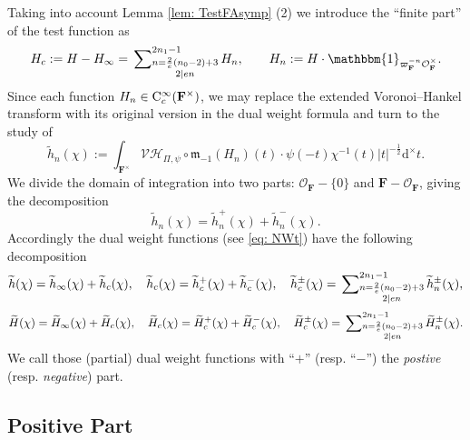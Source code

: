 \documentclass[A4]{amsart}
\numberwithin{equation}{section} \everymath{\displaystyle}
\newcommand{\Cont}{{\rm C}}
\newcommand{\id}{\mathbbm{1}}
\newcommand{\ud}{\mathrm{d}}
\newcommand{\F}{\mathbf{F}}
\newcommand{\vO}{\mathcal{O}}
\newcommand{\norm}[1][\cdot]{\lvert #1 \rvert}
\newcommand{\Mult}{\mathfrak{m}}
\newcommand{\VorH}{\mathcal{VH}}
\begin{document}
	Taking into account Lemma \ref{lem: TestFAsymp} (2) we introduce the ``finite part'' of the test function as
\begin{equation} \label{eq: TestFComp}
	H_c := H-H_{\infty} = \sideset{}{_{\substack{n=\frac{2}{e}(n_0-2)+3 \\ 2 \mid en}}^{2n_1-1}} \sum H_n, \qquad H_n := H \cdot \id_{\varpi_{\F}^{-n} \vO_{\F}^{\times}}.
\end{equation}
	Since each function $H_n \in \Cont_c^{\infty}(\F^{\times})$, we may replace the extended Voronoi--Hankel transform with its original version in the dual weight formula and turn to the study of
\begin{equation} \label{eq: DWtFLeveln}
	\widetilde{h}_n(\chi) := \int_{\F^{\times}} \VorH_{\Pi,\psi} \circ \Mult_{-1}(H_n)(t) \cdot \psi(-t) \chi^{-1}(t) \norm[t]^{-\frac{1}{2}} \ud^{\times} t.
\end{equation}
	We divide the domain of integration into two parts: $\vO_{\F}-\{ 0 \}$ and $\F-\vO_{\F}$, giving the decomposition
\begin{equation} \label{eq: DWtFLevelnDecomp}
	\widetilde{h}_n(\chi) = \widetilde{h}_n^+(\chi) + \widetilde{h}_n^-(\chi). 
\end{equation}
	Accordingly the dual weight functions (see \eqref{eq: NWt}) have the following decomposition
\begin{equation} \label{eq: DWtFDecomp}
	\widetilde{h}(\chi) = \widetilde{h}_{\infty}(\chi) + \widetilde{h}_{c}(\chi), \quad \widetilde{h}_{c}(\chi) = \widetilde{h}_{c}^+(\chi) + \widetilde{h}_{c}^-(\chi), \quad \widetilde{h}_{c}^{\pm}(\chi) = \sideset{}{_{\substack{n=\frac{2}{e}(n_0-2)+3 \\ 2 \mid en}}^{2n_1-1}} \sum \widetilde{h}_n^{\pm}(\chi),
\end{equation}
\begin{equation} \label{eq: NDWtFDecomp}
	\widetilde{H}(\chi) = \widetilde{H}_{\infty}(\chi) + \widetilde{H}_{c}(\chi), \quad \widetilde{H}_{c}(\chi) = \widetilde{H}_{c}^+(\chi) + \widetilde{H}_{c}^-(\chi), \quad \widetilde{H}_{c}^{\pm}(\chi) = \sideset{}{_{\substack{n=\frac{2}{e}(n_0-2)+3 \\ 2 \mid en}}^{2n_1-1}} \sum \widetilde{H}_n^{\pm}(\chi).
\end{equation}
	We call those (partial) dual weight functions with ``$+$'' (resp. ``$-$'') the \emph{postive} (resp. \emph{negative}) part.


	\subsection{Positive Part}
	
\end{document}
